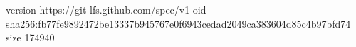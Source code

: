 version https://git-lfs.github.com/spec/v1
oid sha256:fb77fe9892472be13337b945767e0f6943cedad2049ca383604d85c4b97bfd74
size 174940
